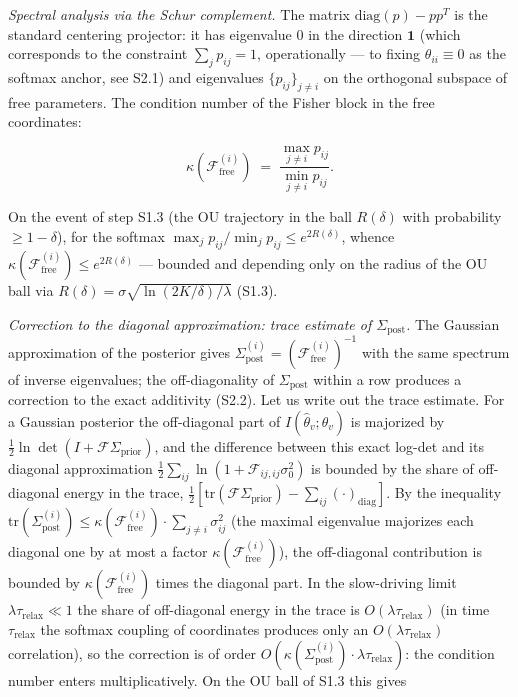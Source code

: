 \documentclass[pdflatex,sn-mathphys-ay]{sn-jnl}
\begin{document}
\emph{Spectral analysis via the Schur complement.} The matrix \(\text{diag}(p) - pp^T\) is the standard centering projector: it has eigenvalue \(0\) in the direction \(\mathbf{1}\) (which corresponds to the constraint \(\sum_j p_{ij} = 1\), operationally --- to fixing \(\theta_{ii} \equiv 0\) as the softmax anchor, see S2.1) and eigenvalues \(\{p_{ij}\}_{j \ne i}\) on the orthogonal subspace of free parameters. The condition number of the Fisher block in the free coordinates:



\begin{equation}\kappa(\mathcal{F}^{(i)}_{\text{free}}) \;=\; \frac{\max_{j \ne i} p_{ij}}{\min_{j \ne i} p_{ij}}. \tag{S2.2a}\end{equation}



On the event of step S1.3 (the OU trajectory in the ball \(R(\delta)\) with probability \(\ge 1-\delta\)), for the softmax \(\max_j p_{ij} / \min_j p_{ij} \le e^{2R(\delta)}\), whence \(\kappa(\mathcal{F}^{(i)}_{\text{free}}) \le e^{2R(\delta)}\) --- bounded and depending only on the radius of the OU ball via \(R(\delta) = \sigma\sqrt{\ln(2K/\delta)/\lambda}\) (S1.3).



\emph{Correction to the diagonal approximation: trace estimate of \(\Sigma_{\text{post}}\).} The Gaussian approximation of the posterior gives \(\Sigma_{\text{post}}^{(i)} = (\mathcal{F}^{(i)}_{\text{free}})^{-1}\) with the same spectrum of inverse eigenvalues; the off-diagonality of \(\Sigma_{\text{post}}\) within a row produces a correction to the exact additivity (S2.2). Let us write out the trace estimate. For a Gaussian posterior the off-diagonal part of \(I(\hat\theta_v;\theta_v)\) is majorized by \(\tfrac12\ln\det(I + \mathcal{F}\Sigma_{\text{prior}})\), and the difference between this exact log-det and its diagonal approximation \(\tfrac12\sum_{ij}\ln(1 + \mathcal{F}_{ij,ij}\sigma_0^2)\) is bounded by the share of off-diagonal energy in the trace, \(\tfrac12[\text{tr}(\mathcal{F}\Sigma_{\text{prior}}) - \sum_{ij}(\cdot)_{\text{diag}}]\). By the inequality \(\text{tr}(\Sigma_{\text{post}}^{(i)}) \le \kappa(\mathcal{F}^{(i)}_{\text{free}}) \cdot \sum_{j\ne i}\sigma_{ij}^2\) (the maximal eigenvalue majorizes each diagonal one by at most a factor \(\kappa(\mathcal{F}^{(i)}_{\text{free}})\)), the off-diagonal contribution is bounded by \(\kappa(\mathcal{F}^{(i)}_{\text{free}})\) times the diagonal part. In the slow-driving limit \(\lambda \tau_{\text{relax}} \ll 1\) the share of off-diagonal energy in the trace is \(O(\lambda\tau_{\text{relax}})\) (in time \(\tau_{\text{relax}}\) the softmax coupling of coordinates produces only an \(O(\lambda\tau_{\text{relax}})\) correlation), so the correction is of order \(O(\kappa(\Sigma_{\text{post}}^{(i)}) \cdot \lambda \tau_{\text{relax}})\): the condition number enters multiplicatively. On the OU ball of S1.3 this gives
\end{document}
